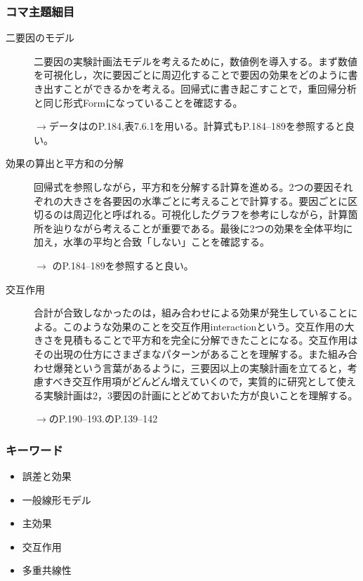\subsubsection{コマ主題細目}
\begin{description}

	\item[二要因のモデル]二要因の実験計画法モデルを考えるために，数値例を導入する。まず数値を可視化し，次に要因ごとに周辺化することで要因の効果をどのように書き出すことができるかを考える。回帰式に書き起こすことで，重回帰分析と同じ形式Formになっていることを確認する。
	      \begin{flushright}
		      $\to$データは\textcite{Yamada2004}のP.184,表7.6.1を用いる。計算式もP.184--189を参照すると良い。
	      \end{flushright}

	\item[効果の算出と平方和の分解]回帰式を参照しながら，平方和を分解する計算を進める。2つの要因それぞれの大きさを各要因の水準ごとに考えることで計算する。要因ごとに区切るのは周辺化と呼ばれる。可視化したグラフを参考にしながら，計算箇所を辿りながら考えることが重要である。最後に2つの効果を全体平均に加え，水準の平均と合致「しない」ことを確認する。
	      \begin{flushright}
		      $\to$ \textcite{Yamada2004}のP.184--189を参照すると良い。
	      \end{flushright}

	\item[交互作用]合計が合致しなかったのは，組み合わせによる効果が発生していることによる。このような効果のことを交互作用interactionという。交互作用の大きさを見積もることで平方和を完全に分解できたことになる。交互作用はその出現の仕方にさまざまなパターンがあることを理解する。また組み合わせ爆発という言葉があるように，三要因以上の実験計画を立てると，考慮すべき交互作用項がどんどん増えていくので，実質的に研究として使える実験計画は2，3要因の計画にとどめておいた方が良いことを理解する。
	      \begin{flushright}
		      $\to$\textcite{Yamada2004}のP.190--193.\textcite{kosugi2019}のP.139--142
	      \end{flushright}


\end{description}
\subsubsection{キーワード}
\begin{itemize}
	\item 誤差と効果
	\item 一般線形モデル
	\item 主効果
	\item 交互作用
	\item 多重共線性
\end{itemize}
